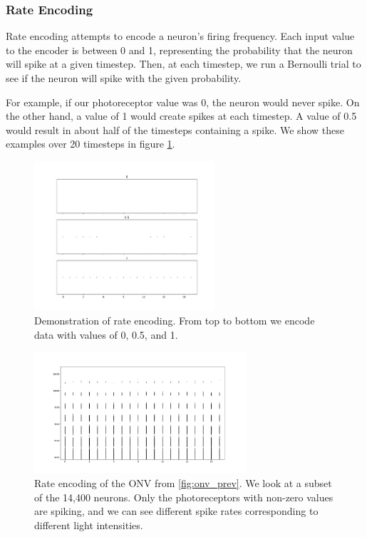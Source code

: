 \documentclass[../taasin.tex]{subfiles}
\begin{document}

\subsubsection{Rate Encoding}

Rate encoding attempts to encode a neuron's firing frequency. Each input value to the encoder is between 0 and 1, representing the probability that the neuron will spike at a given timestep. Then, at each timestep, we run a Bernoulli trial to see if the neuron will spike with the given probability.

For example, if our photoreceptor value was 0, the neuron would never spike. On the other hand, a value of 1 would create spikes at each timestep. A value of 0.5 would result in about half of the timesteps containing a spike. We show these examples over 20 timesteps in figure \ref{fig:rate_encode_3plots}.

\begin{figure}[h]
    \centering
    \includegraphics[width=0.6\textwidth]{figures/neuron_3_rate.pdf}
    \caption{Demonstration of rate encoding. From top to bottom we encode data with values of 0, 0.5, and 1.}
    \label{fig:rate_encode_3plots}
\end{figure}

\begin{figure}[h]
    \centering
    \includegraphics[width=0.7\textwidth]{figures/onv_rate_prev.pdf}
    \caption{Rate encoding of the ONV from \ref{fig:onv_prev}. We look at a subset of the 14,400 neurons. Only the photoreceptors with non-zero values are spiking, and we can see different spike rates corresponding to different light intensities. }
    \label{fig:onv_encode_rate}
\end{figure}
\end{document}
